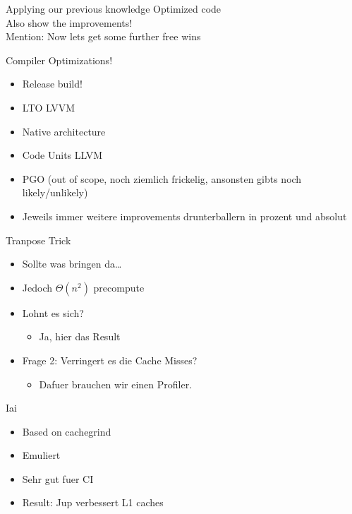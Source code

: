 \documentclass[compress,aspectratio=169]{beamer}
\begin{document}
\begin{frame}{Applying our previous knowledge}
  Optimized code\\
  Also show the improvements!\\
  Mention: Now lets get some further free wins
\end{frame}

\begin{frame}{Compiler Optimizations!}
  \begin{itemize}
    \item Release build!
    \item LTO LVVM
    \item Native architecture
    \item Code Units LLVM
    \item PGO (out of scope, noch ziemlich frickelig, ansonsten gibts noch likely/unlikely)
    \item Jeweils immer weitere improvements drunterballern in prozent und absolut
  \end{itemize}
\end{frame}

\begin{frame}{Tranpose Trick}
  \begin{itemize}
    \item Sollte was bringen da\dots
    \item Jedoch $\Theta(n^2)$ precompute
    \item Lohnt es sich?
      \begin{itemize}
        \item Ja, hier das Result
      \end{itemize}
    \item Frage 2: Verringert es die Cache Misses?
      \begin{itemize}
        \item Dafuer brauchen wir einen Profiler.
      \end{itemize}
  \end{itemize}
\end{frame}

\begin{frame}{Iai}
  \begin{itemize}
    \item Based on cachegrind
    \item Emuliert
    \item Sehr gut fuer CI
    \item Result: Jup verbessert L1 caches
  \end{itemize}
\end{frame}
\end{document}
